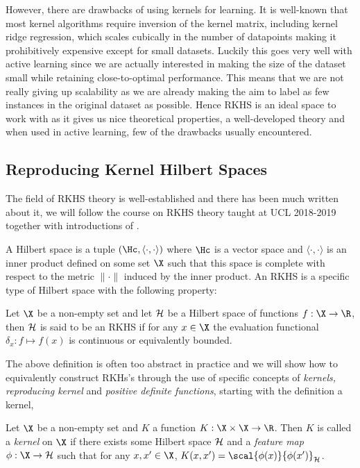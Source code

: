 However, there are drawbacks of using kernels for learning. It is well-known
that most kernel algorithms require inversion of the kernel matrix, including
kernel ridge regression, which scales cubically in the number of datapoints
\cite{saunders98_ridge_regres_learn_algor_dual_variab} making it prohibitively
expensive except for small datasets. Luckily this goes very well with active
learning since we are actually interested in making the size of the dataset
small while retaining close-to-optimal performance. This means that we are not
really giving up scalability as we are already making the aim to label as few
instances in the original dataset as possible. Hence RKHS is an ideal space to
work with as it gives us nice theoretical properties, a well-developed theory
and when used in active learning, few of the drawbacks usually encountered.

\subsection{Reproducing Kernel Hilbert Spaces} The field of RKHS theory is
well-established and there has been much written about it, we will follow the
course on RKHS theory taught at UCL 2018-2019
\cite{gretton18_advan_topic_machin_learn} together with introductions of
\cite{manton15_primer_reprod_kernel_hilber_spaces,fasshauer11_posit_defin_kernel}.

A Hilbert space is a tuple \((\Hc, \langle \cdot, \cdot \rangle)\) where \(\Hc\)
is a vector space and \(\langle \cdot, \cdot \rangle\) is an inner product
defined on some set \(\X\) such that this space is complete with respect to the
metric \(\|\cdot\|\) induced by the inner product. An RKHS is a specific type of
Hilbert space with the following property:

\begin{definition}
\label{def:RKHS} Let \(\X\) be a non-empty set and let \(\mathcal{H}\) be a Hilbert
space of functions \(f: \X \to \R\), then \(\mathcal{H}\) is said to be an RKHS if
for any \(x \in \X\) the evaluation functional \(\delta_x: f \mapsto f(x)\) is
continuous or equivalently bounded.
\end{definition}

The above definition is often too abstract in practice and we will show how to
equivalently construct RKHs's through the use of specific concepts of
\emph{kernels, reproducing kernel} and \emph{positive definite functions},
starting with the definition a kernel,
\begin{definition}
\label{def:kernel} Let \(\X\) be a non-empty set and \(K\) a function \(K: \X
\times \X \to \R\). Then \(K\) is called a \textit{kernel} on \(\X\) if there
exists some Hilbert space \(\mathcal{H}\) and a \textit{feature map} \(\phi : \X
\to \rkhs{H}\) such that for any \(x, x' \in \X\), \(K(x, x') =
\scal{\phi(x)}{\phi(x')}_{\rkhs{H}}\).
\end{definition}

